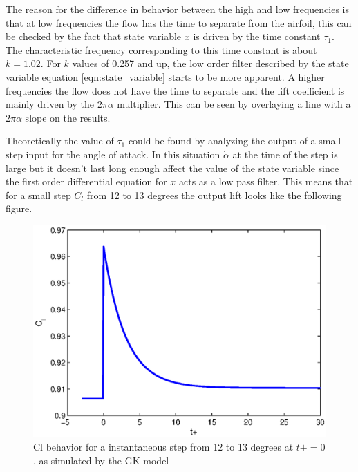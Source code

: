 \par The reason for the difference in behavior between the high and low frequencies is that at low frequencies the flow has the time to separate from the airfoil, this can be checked by the fact that state variable $x$ is driven by the time constant $\tau_1$.
The characteristic frequency corresponding to this time constant is about $k=1.02$.
For $k$ values of 0.257 and up, the low order filter described by the state variable equation \ref{eqn:state_variable} starts to be more apparent.
A higher frequencies the flow does not have the time to separate and the lift coefficient is mainly driven by the $2\pi\alpha$ multiplier.
This can be seen by overlaying a line with a $2\pi\alpha$ slope on the results.

\par Theoretically the value of $\tau_1$ could be found by analyzing the output of a small step input for the angle of attack.
In this situation $\dot{\alpha}$ at the time of the step is large but it doesn't last long enough affect the value of the state variable since the first order differential equation for $x$ acts as a low pass filter.
This means that for a small step $C_l$ from 12 to 13 degrees the output lift looks like the following figure.

\begin{figure}[h]
  \centering
  \includegraphics{./Figures/Cl_vs_tplus_step_12to13.eps}
  \caption{Cl behavior for a instantaneous step from 12 to 13 degrees at $t+=0$, as simulated by the GK model}
  \label{fig:Cl_for_alpha_step}
\end{figure}

\FloatBarrier

